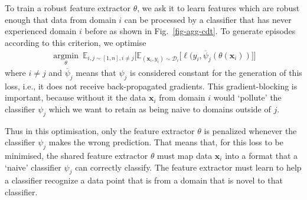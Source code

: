 \documentclass[10pt,twocolumn,letterpaper]{article}
\begin{document}
To train a robust feature extractor $\theta$, we ask it to learn {features which are robust enough that data from domain $i$ can be processed by a classifier that has never experienced domain $i$ before as shown in Fig.~\ref{fig-agg-cdt}}. To generate episodes according to this criterion, we optimise
\begin{equation}
\begin{aligned}
\label{eq:agg-reg-feat}
\underset{\theta}{\operatorname{argmin}}~
\mathbb{E}_{i,j\sim[1,n], i\neq j} \big[ \mathbb{E}_{(\mathbf{x}_i,y_i)\sim \mathcal{D}_i} \big[  \ell(y_i, \overline{\psi}_j(\theta(\mathbf{x}_i)) \big] \big]
\end{aligned}
\end{equation}
\noindent where $i\neq j$ and  $\overline{\psi}_j$ means that $\psi_j$ is considered constant for the generation of this loss, i.e., it does not receive back-propagated gradients. This gradient-blocking is important, because without it the data $\mathbf{x}_i$  from domain $i$ would `pollute' the classifier $\psi_j$ which we want to retain as being naive to domains outside of $j$. 


Thus in this optimisation, only the feature extractor $\theta$ is penalized whenever the classifier $\psi_j$ makes the wrong prediction. That means that, for this loss to be minimised, the shared feature extractor $\theta$ must map data $\mathbf{x}_i$ into a format that a `naive' classifier $\psi_j$ can correctly classify. The feature extractor must learn to help a classifier recognize a data point that is from a domain that is novel to that classifier.
\end{document}
